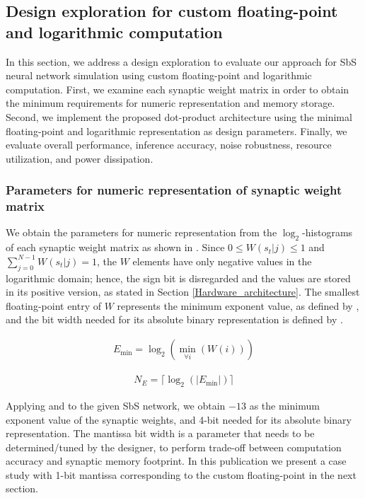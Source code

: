 \subsection{Design exploration for custom floating-point and logarithmic computation}

In this section, we address a design exploration to evaluate our approach for SbS neural network simulation using custom floating-point and logarithmic computation. First, we examine each synaptic weight matrix in order to obtain the minimum requirements for numeric representation and memory storage. Second, we implement the proposed dot-product architecture using the minimal floating-point and logarithmic representation as design parameters. Finally, we evaluate overall performance, inference accuracy, noise robustness, resource utilization, and power dissipation.

\subsubsection{Parameters for numeric representation of synaptic weight matrix}

We obtain the parameters for numeric representation from the $\log_2$-histograms of each synaptic weight matrix as shown in . Since $0\le W(s_t|j)\le1$ and $\sum_{j=0}^{N-1}W(s_t|j)=1$, the $W$ elements have only negative values in the logarithmic domain; hence, the sign bit is disregarded and the values are stored in its positive version, as stated in Section \ref{Hardware_architecture}. The smallest floating-point entry of $W$ represents the minimum exponent value, as defined by , and the bit width needed for its absolute binary representation is defined by .

\begin{eqnarray} \label{eq:exp_max}
E_{\min}=\log _2(\min_{\forall i}(W(i)))
\end{eqnarray}

\begin{eqnarray} \label{eq:bits_exp}
N_E=\lceil\log_2(|E_{\min}|)\rceil
\end{eqnarray}

Applying  and  to the given SbS network, we obtain $-13$ as the minimum exponent value of the synaptic weights, and 4-bit needed for its absolute binary representation. The mantissa bit width is a parameter that needs to
be determined/tuned by the designer, to perform trade-off between computation accuracy and synaptic memory footprint. In this publication we present a case study with 1-bit mantissa corresponding to the custom floating-point in the next section.

